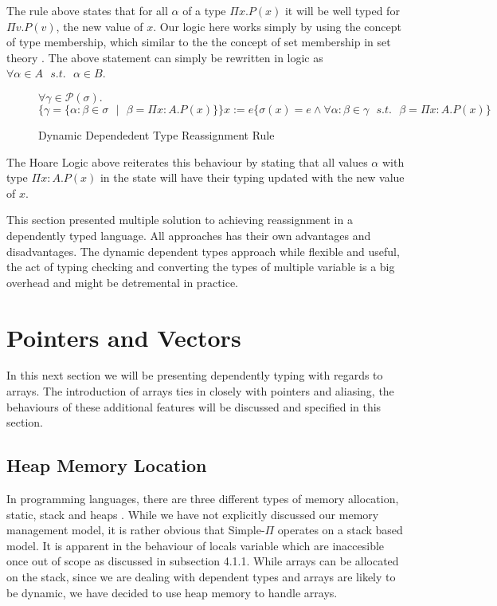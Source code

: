 \documentclass[a4paper,12pt]{report}
\begin{document}
The rule above states that for all $\alpha$ of a type $\Pi x.P(x)$ it will be 
well typed for $\Pi v.P(v)$, the new value of $x$. Our logic here works simply 
by using the concept of type membership, which similar to the the 
concept of set membership in set theory \cite{RussellMathematicalLA}. 
The above statement can simply be rewritten in logic as 
$\forall \alpha \in A\text{ }s.t.\text{ }\alpha \in B$.


\begin{figure}[H]
  \begin{center}
    $\forall \gamma \in \mathcal{P}(\sigma).$\\
    \footnotesize$\{\gamma = \{\alpha : \beta \in \sigma\text{ }|\text{ }\beta = 
    \Pi x : A. P(x)\}\}x:= e\{\sigma(x) = e \wedge 
    \forall \alpha : \beta \in \gamma\text{ }s.t.\text{ }\beta = \Pi x : A. P(x)\}$ 
    \normalsize
  \end{center}
  \caption{Dynamic Dependedent Type Reassignment Rule}
\end{figure}


\par
The Hoare Logic above reiterates this behaviour by stating that all values $\alpha$ with 
type $\Pi x : A.P(x)$ in the state will have their typing updated with the new value 
of $x$.

This section presented multiple solution to achieving reassignment in a 
dependently typed language. All approaches has their own advantages and 
disadvantages. The dynamic dependent types approach while flexible and useful, 
the act of typing checking and converting the types of multiple variable is a 
big overhead and might be detremental in practice. 

\section{Pointers and Vectors}
In this next section we will be presenting dependently typing with regards to 
arrays. The introduction of arrays ties in closely with pointers and aliasing, 
the behaviours of these additional features will be discussed and specified in this 
section.

\subsection{Heap Memory Location}
In programming languages, there are three different types of memory allocation, 
static, stack and heaps \cite{heapVsStack}. While we have not explicitly 
discussed our memory management model, it is rather obvious that Simple-$\Pi$ 
operates on a stack based model. It is apparent in the behaviour of locals 
variable which are inaccesible once out of scope as discussed in subsection 
4.1.1. While arrays can be allocated on the stack, since we are dealing 
with dependent types and arrays are likely to be dynamic, we have decided to use heap 
memory to handle arrays. 
\end{document}
